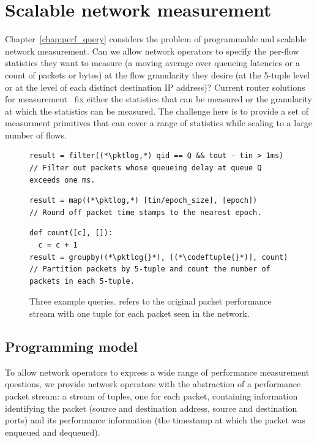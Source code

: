 \section{Scalable network measurement}
Chapter~\ref{chap:perf_query} considers the problem of programmable and
scalable network measurement. Can we allow network operators to specify the
per-flow statistics they want to measure (\eg a moving average over queueing
latencies or a count of packets or bytes) at the flow granularity they desire
(\eg at the 5-tuple level or at the level of each distinct destination IP
address)? Current router solutions for measurement~\cite{netflow,
tetration-telemetry} fix either the statistics that can be measured or the
granularity at which the statistics can be measured. The challenge here is to
provide a set of measurment primitives that can cover a range of statistics
while scaling to a large number of flows.

\begin{figure}
\begin{minipage}[!h]{\textwidth}
\centering
\begin{lstlisting}
result = filter((*\pktlog,*) qid == Q && tout - tin > 1ms)
// Filter out packets whose queueing delay at queue Q exceeds one ms.
\end{lstlisting}
\end{minipage}

\begin{minipage}[!h]{\textwidth}
\centering
\begin{lstlisting}
result = map((*\pktlog,*) [tin/epoch_size], [epoch])
// Round off packet time stamps to the nearest epoch.
\end{lstlisting}
\end{minipage}

\begin{minipage}[!h]{\textwidth}
\begin{lstlisting}
def count([c], []):
  c = c + 1
result = groupby((*\pktlog{}*), [(*\codeftuple{}*)], count)
// Partition packets by 5-tuple and count the number of packets in each 5-tuple.
\end{lstlisting}
\end{minipage}
\caption{Three example \TheSystem queries. {\ct \pktlog{}} refers to the
original packet performance stream with one tuple for each packet seen in the
network.}
\label{fig:example_queries}
\end{figure}

\subsection{Programming model} To allow network operators to express a wide
range of performance measurement questions, we provide network operators with
the abstraction of a performance packet stream: a stream of tuples, one for
each packet, containing information identifying the packet (source and
destination address, source and destination ports) and its performance
information (the timestamp at which the packet was enqueued and dequeued).


